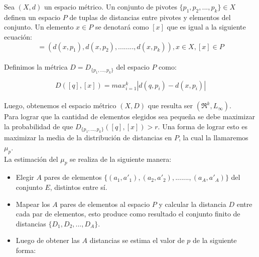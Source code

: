 Sea $(X,d)$ un espacio m\'etrico. Un conjunto de pivotes $\{p_1,p_2,...,p_k\} \in X$ definen un espacio $P$ de tuplas de distancias entre pivotes y elementos del conjunto. Un elemento $x \in P$ se denotar\'a como $[x]$ que es igual a la siguiente ecuaci\'on:\\

\begin{equation}
[x] = (d(x,p_1),d(x,p_2),........,d(x,p_k)), x \in X, [x] \in P
\label{eq-mapeo}
\end{equation}
\\

\noindent Definimos la m\'etrica $D = D_{\{p_1,...,p_k\}}$ del espacio $P$ como:

\begin{equation}
D([q],[x]) = max_{i=1}^k |d(q,p_i) - d(x,p_i)|
\label{eq-met-esp}
\end{equation}
\\

Luego, obtenemos el espacio m\'etrico $(X,D)$ que resulta ser $(\Re^k, L_{\infty})$. \\


Para lograr que la cantidad de elementos elegidos sea peque\~na se debe maximizar la probabilidad de que $D_{\{p_1,...,p_k\}}([q],[x]) > r$. Una forma de lograr esto es maximizar la media de la distribuci\'on de distancias en $P$, la cual la llamaremos $\mu_p$.\\
 

\noindent La estimaci\'on del $\mu_p$ se realiza de la siguiente manera:\\

\begin{itemize}
	\item Elegir $A$ pares de elementos $\{(a_1,a'_1),(a_2,a'_2),.......,(a_A,a'_A)\}$ del conjunto $E$, distintos entre s\'i.
	\item Mapear los $A$ pares de elementos al espacio $P$ y calcular la distancia $D$ entre cada par de elementos, esto produce como resultado el conjunto finito de distancias $\{D_1,D_2,...,D_A\}$.
	\item Luego de obtener las $A$ distancias se estima el valor de $p$ de la siguiente forma:
\end{itemize}

